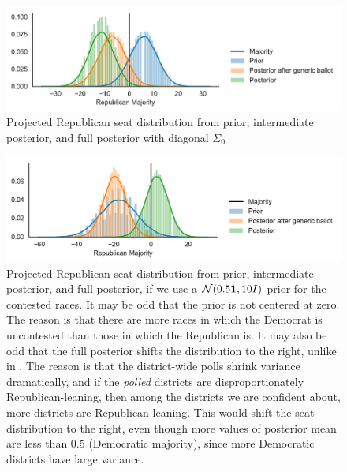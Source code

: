\documentclass[12pt, letterpaper]{article}
\begin{document}
\begin{figure}[tbh]
  \centering
  \includegraphics[width=\textwidth]{rep_seats_with_diagonal_prior.pdf}
  \caption{Projected Republican seat distribution from prior, intermediate
  posterior, and full posterior with diagonal $\Sigma_0$}
  \label{fig:diagonal_prior}
\end{figure}

\begin{figure}[tbh]
  \centering
  \includegraphics[width=\textwidth]{rep_seats_with_diffused_prior.pdf}
  \caption{Projected Republican seat distribution from prior, intermediate posterior, and full posterior, if we use a $\mathcal{N}(0.5\bm{1}, 10I)$ prior for the contested races. It may be odd that the prior is not centered at zero. The reason is that there are more races in which the Democrat is uncontested than those in which the Republican is. It may also be odd that the full posterior shifts the distribution to the right, unlike in . The reason is that the district-wide polls shrink variance dramatically, and if the \emph{polled} districts are disproportionately Republican-leaning, then among the districts we are confident about, more districts are Republican-leaning. This would shift the seat distribution to the right, even though more values of posterior mean are less than $0.5$ (Democratic majority), since more Democratic districts have large variance.}
  \label{fig:hists_diffuse}
\end{figure}
\end{document}
